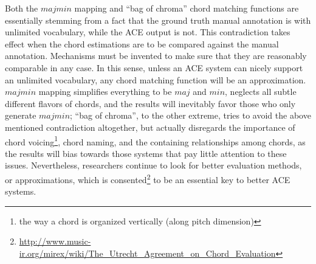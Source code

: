 Both the $majmin$ mapping and ``bag of chroma'' chord matching functions are essentially stemming from a fact that the ground truth manual annotation is with unlimited vocabulary, while the ACE output is not. This contradiction takes effect when the chord estimations are to be compared against the manual annotation. Mechanisms must be invented to make sure that they are reasonably comparable in any case. In this sense, unless an ACE system can nicely support an unlimited vocabulary, any chord matching function will be an approximation. $majmin$ mapping simplifies everything to be $maj$ and $min$, neglects all subtle different flavors of chords, and the results will inevitably favor those who only generate $majmin$; ``bag of chroma'', to the other extreme, tries to avoid the above mentioned contradiction altogether, but actually disregards the importance of chord voicing\footnote{the way a chord is organized vertically (along pitch dimension)}, chord naming, and the containing relationships among chords, as the results will bias towards those systems that pay little attention to these issues. Nevertheless, researchers continue to look for better evaluation methods, or approximations, which is consented\footnote{\url{http://www.music-ir.org/mirex/wiki/The\_Utrecht\_Agreement\_on\_Chord\_Evaluation}} to be an essential key to better ACE systems.

